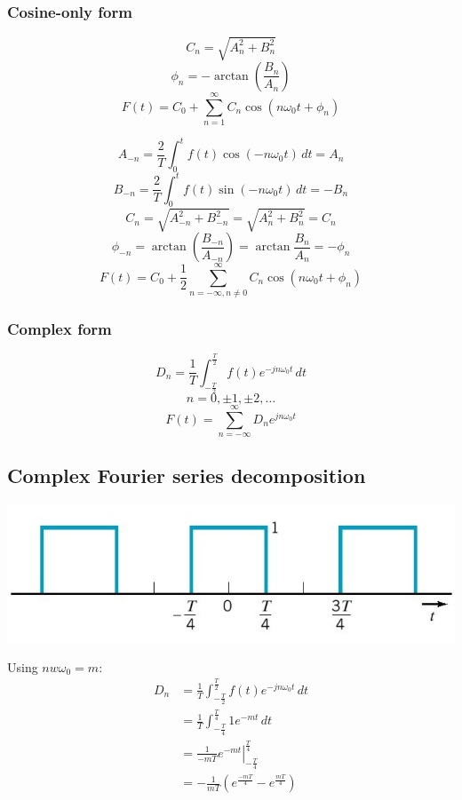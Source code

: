 \documentclass[11pt]{article}
\begin{document}
\subsubsection{Cosine-only form}
\label{sec:org257aa60}
\[C_n = \sqrt{A_n^2 + B_n^2}\]
\[\phi_n = - \arctan \left(\frac{B_n}{A_n} \right)\]
\[F(t) = C_0 + \sum_{n = 1}^{\infty} C_n \cos (n \omega_0 t + \phi_n)\]

\[A_{-n} = \frac{2}{T} \int_0^t f(t) \cos (-n \omega_0 t) \, dt = A_n\]
\[B_{-n} = \frac{2}{T} \int_0^t f(t) \sin (-n \omega_0 t) \, dt = -B_n\]
\[C_n = \sqrt{A_{-n}^2 + B_{-n}^2} = \sqrt{A_n^2 + B_n^2} = C_n\]
\[\phi_{-n} = \arctan \left(\frac{B_{-n}}{A_{-n}} \right) = \arctan \frac{B_{n}}{A_n} = - \phi_n\]
\[F(t) = C_0 + \frac{1}{2} \sum_{n = -\infty, n \ne 0}^{\infty} C_n \cos(n \omega_0 t + \phi_n)\]
\subsubsection{Complex form}
\label{sec:org48d8346}
\[D_n = \frac{1}{T} \int_{-\frac{T}{2}}^{\frac{T}{2}} f(t) e^{-jn \omega_0 t} \, dt\]
\[n = 0, \pm 1, \pm 2, \ldots\]
\[F(t) = \sum_{n = - \infty}^{\infty} D_n e^{jn \omega_0 t}\]
\subsection{Complex Fourier series decomposition}
\label{sec:org01fc219}
\begin{center}
\includegraphics[width=.9\linewidth]{./images/even-square-wave-function.png}
\end{center}

Using \(nw \omega_0 = m\):
\begin{align*}
D_n &= \frac{1}{T} \int_{-\frac{T}{2}}^{\frac{T}{2}} f(t) e^{-jn \omega_0 t} \, dt \\
&= \frac{1}{T} \int_{-\frac{T}{4}}^{\frac{T}{4}} 1 e^{-mt} \, dt \\
&= \left. \frac{1}{-mT} e^{-mt} \right|_{-\frac{T}{4}}^{\frac{T}{4}} \\
&= - \frac{1}{mT} \left(e^{\frac{-mT}{4}} - e^{\frac{mT}{4}} \right)
\end{align*}
\end{document}
